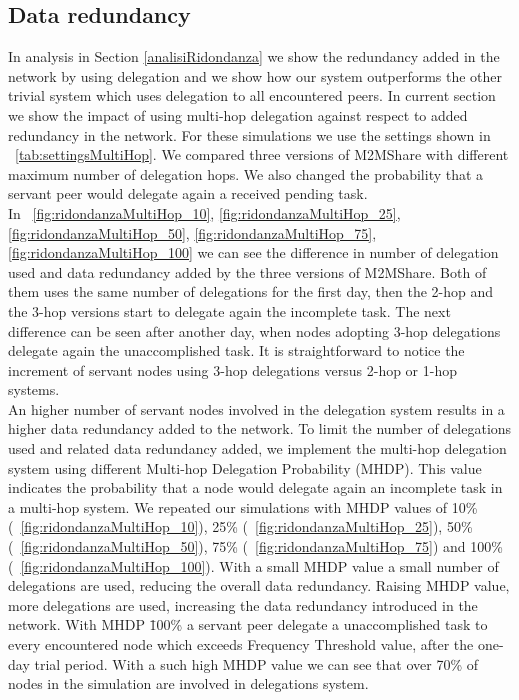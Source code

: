 \newpage
\subsection{Data redundancy}
\label{analisiRidondanzaMultiHop}
In analysis in Section \ref{analisiRidondanza} we show the redundancy added in the network by using delegation and we show how our system outperforms the other trivial system which uses delegation to all encountered peers. In current section we show the impact of using multi-hop delegation against respect to added redundancy in the network. For these simulations we use the settings shown in \tablename~\ref{tab:settingsMultiHop}. We compared three versions of M2MShare with different maximum number of delegation hops. We also changed the probability that a servant peer would delegate again a received pending task.
\\

In \figurename~\ref{fig:ridondanzaMultiHop_10}, \ref{fig:ridondanzaMultiHop_25}, \ref{fig:ridondanzaMultiHop_50}, \ref{fig:ridondanzaMultiHop_75}, \ref{fig:ridondanzaMultiHop_100} we can see the difference in number of delegation used and data redundancy added by the three versions of M2MShare. Both of them uses the same number of delegations for the first day, then the 2-hop and the 3-hop versions start to delegate again the incomplete task. The next difference can be seen after another day, when nodes adopting 3-hop delegations delegate again the unaccomplished task. It is straightforward to notice the increment of servant nodes using 3-hop delegations versus 2-hop or 1-hop systems.
\\

An higher number of servant nodes involved in the delegation system results in a higher data redundancy added to the network. To limit the number of delegations used and related data redundancy added, we implement the multi-hop delegation system using different Multi-hop Delegation Probability (MHDP). This value indicates the probability that a node would delegate again an incomplete task in a multi-hop system. We repeated our simulations with MHDP values of 10\% (\figurename~\ref{fig:ridondanzaMultiHop_10}), 25\% (\figurename~\ref{fig:ridondanzaMultiHop_25}), 50\% (\figurename~\ref{fig:ridondanzaMultiHop_50}), 75\% (\figurename~\ref{fig:ridondanzaMultiHop_75}) and 100\% (\figurename~\ref{fig:ridondanzaMultiHop_100}). With a small MHDP value a small number of delegations are used, reducing the overall data redundancy. Raising MHDP value, more delegations are used, increasing the data redundancy introduced in the network. With MHDP \= 100\% a servant peer delegate a unaccomplished task to every encountered node which exceeds Frequency Threshold value, after the one-day trial period. With a such high MHDP value we can see that over 70\% of nodes in the simulation are involved in delegations system.

